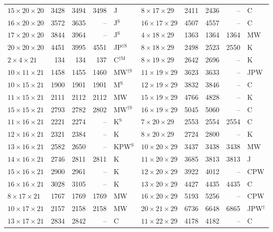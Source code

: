 \begin{longtable}{@{}lrrrl@{\hspace{6mm}}lrrrl@{}}
$15{\times}20{\times}20$ & 3428 & 3494 & 3498 & J & $8{\times}17{\times}29$ & 2411 & 2436 & -- & C\\
$16{\times}20{\times}20$ & 3572 & 3635 & -- & J$^{\mathrm{S}}$ & $16{\times}17{\times}29$ & 4507 & 4557 & -- & C\\
$17{\times}20{\times}20$ & 3844 & 3964 & -- & J$^{\mathrm{S}}$ & $4{\times}18{\times}29$ & 1363 & 1364 & 1364 & MW\\
$20{\times}20{\times}20$ & 4451 & 3995 & 4551 & JP$^{\dagger\mathrm{S}}$ & $8{\times}18{\times}29$ & 2498 & 2523 & 2550 & K\\
$2{\times}4{\times}21$ & 134 & 134 & 137 & C$^{\dagger\mathrm{M}}$ & $8{\times}19{\times}29$ & 2642 & 2696 & -- & K\\
$10{\times}11{\times}21$ & 1458 & 1455 & 1460 & MW$^{\dagger\mathrm{S}}$ & $11{\times}19{\times}29$ & 3623 & 3633 & -- & JPW\\
$10{\times}15{\times}21$ & 1900 & 1901 & 1901 & M$^{\mathrm{S}}$ & $12{\times}19{\times}29$ & 3832 & 3846 & -- & C\\
$11{\times}15{\times}21$ & 2111 & 2112 & 2112 & MW & $15{\times}19{\times}29$ & 4766 & 4828 & -- & K\\
$15{\times}15{\times}21$ & 2793 & 2782 & 2802 & MW$^{\dagger\mathrm{S}}$ & $16{\times}19{\times}29$ & 5045 & 5060 & -- & C\\
$11{\times}16{\times}21$ & 2221 & 2274 & -- & K$^{\mathrm{S}}$ & $7{\times}20{\times}29$ & 2553 & 2554 & 2554 & C\\
$12{\times}16{\times}21$ & 2321 & 2384 & -- & K & $8{\times}20{\times}29$ & 2724 & 2800 & -- & K\\
$13{\times}16{\times}21$ & 2582 & 2650 & -- & KPW$^{\mathrm{S}}$ & $10{\times}20{\times}29$ & 3437 & 3438 & 3438 & MW\\
$14{\times}16{\times}21$ & 2746 & 2811 & 2811 & K & $11{\times}20{\times}29$ & 3685 & 3813 & 3813 & J\\
$15{\times}16{\times}21$ & 2900 & 2961 & -- & K & $12{\times}20{\times}29$ & 3922 & 4012 & -- & CPW\\
$16{\times}16{\times}21$ & 3028 & 3105 & -- & K & $13{\times}20{\times}29$ & 4427 & 4435 & 4435 & C\\
$8{\times}17{\times}21$ & 1767 & 1769 & 1769 & MW & $16{\times}20{\times}29$ & 5193 & 5256 & -- & CPW\\
$10{\times}17{\times}21$ & 2157 & 2158 & 2158 & MW & $20{\times}21{\times}29$ & 6736 & 6648 & 6865 & JPW$^{\dagger}$\\
$13{\times}17{\times}21$ & 2834 & 2842 & -- & C & $11{\times}22{\times}29$ & 4178 & 4182 & -- & C\\

\end{longtable}
